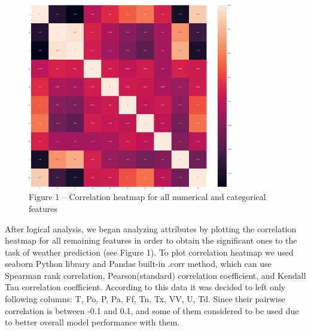 \begin{figure}[H]
	\centering
	\includegraphics[width=0.8\textwidth]{assets/36}
	\caption*{Figure 1 -- Correlation heatmap for all numerical and categorical features}
\end{figure}

\begin{multicols}{2}
After logical analysis, we began analyzing attributes by plotting the
correlation heatmap for all remaining features in order to obtain the
significant ones to the task of weather prediction (see Figure 1). To
plot correlation heatmap we used seaborn Python library and Pandas
built-in .corr method, which can use Spearman rank correlation,
Pearson(standard) correlation coefficient, and Kendall Tau correlation
coefficient. According to this data it was decided to left only
following columns: \textquotesingle T\textquotesingle,
\textquotesingle Po\textquotesingle, \textquotesingle P\textquotesingle,
\textquotesingle Pa\textquotesingle,
\textquotesingle Ff\textquotesingle,
\textquotesingle Tn\textquotesingle,
\textquotesingle Tx\textquotesingle,
\textquotesingle VV\textquotesingle, \textquotesingle U\textquotesingle,
\textquotesingle Td\textquotesingle. Since their pairwise correlation is
between -0.1 and 0.1, and some of them considered to be used due to
better overall model performance with them.
\end{multicols}

